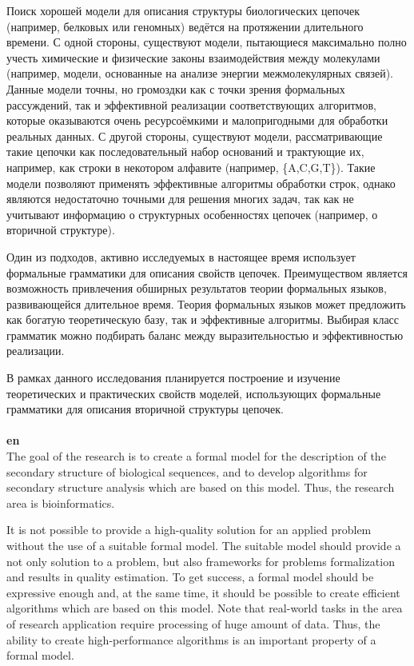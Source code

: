 \documentclass[12pt]{article}  %
\theoremstyle{remark}
\begin{document}
Поиск хорошей модели для описания структуры биологических цепочек (например, белковых или геномных) ведётся на протяжении длительного времени.
С одной стороны, существуют модели, пытающиеся максимально полно учесть химические и физические законы взаимодействия между молекулами (например, модели, основанные на анализе энергии межмолекулярных связей).
Данные модели точны, но громоздки как с точки зрения формальных рассуждений, так и эффективной реализации соответствующих алгоритмов, которые оказываются очень ресурсоёмкими и малопригодными для обработки реальных данных.
С другой стороны, существуют модели, рассматривающие такие цепочки как последовательный набор оснований и трактующие их, например, как строки в некотором алфавите (например, \{A,C,G,T\}).
Такие модели позволяют применять эффективные алгоритмы обработки строк, однако являются недостаточно точными для решения многих задач, так как не учитывают информацию о структурных особенностях цепочек (например, о вторичной структуре).

Один из подходов, активно исследуемых в настоящее время использует формальные грамматики для описания свойств цепочек.
Преимуществом является возможность привлечения обширных результатов теории формальных языков, развивающейся длительное время.
Теория формальных языков может предложить как богатую теоретическую базу, так и эффективные алгоритмы.
Выбирая класс грамматик можно подбирать баланс между выразительностью и эффективностью реализации.

В рамках данного исследования планируется построение и изучение теоретических и практических свойств моделей, использующих формальные грамматики для описания вторичной структуры цепочек.
\\
\\
\textbf{en}\\
The goal of the research is to create a formal model for the description of the secondary structure of biological sequences, and to develop algorithms for secondary structure analysis which are based on this model.
Thus, the research area is bioinformatics.

It is not possible to provide a high-quality solution for an applied problem without the use of a suitable formal model.
The suitable model should provide a not only solution to a problem, but also frameworks for problems formalization and results in quality estimation.
To get success, a formal model should be expressive enough and, at the same time, it should be possible to create efficient algorithms which are based on this model.
Note that real-world tasks in the area of research application require processing of huge amount of data.
Thus, the ability to create high-performance algorithms is an important property of a formal model.
\end{document}
